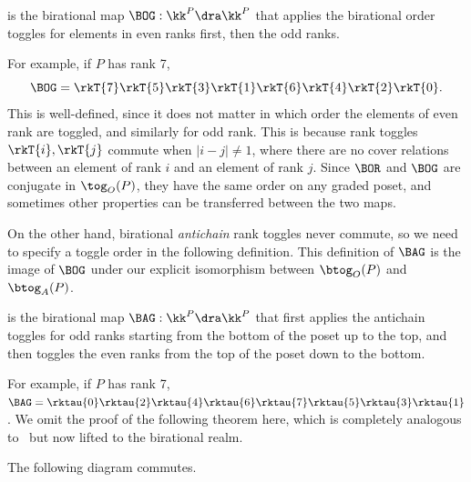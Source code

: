 \begin{defi}
 is the birational map
$\BOG: \kk^P \dra \kk^P$ that applies the birational order toggles for elements in even ranks first, then the odd ranks.
\end{defi}

For example, if $P$ has rank 7,
\[
\BOG=\rkT{7}\rkT{5}\rkT{3}\rkT{1}\rkT{6}\rkT{4}\rkT{2}\rkT{0}.
\]
This is well-defined, since it does not matter in which order the elements of even rank are toggled, and similarly for odd rank.
This is because rank toggles $\rkT{i}, \rkT{j}$ commute when $|i-j|\not= 1$, where there are
no cover relations between an element of rank $i$ and an element of rank $j$. 
Since $\BOR$ and $\BOG$ are conjugate in $\tog_O(P)$,
they have the same order on any graded poset, and sometimes other properties can be transferred between the two maps.

On the other hand, birational \emph{antichain}
rank toggles never commute, so we need to specify a toggle order in the following definition.
This definition of $\BAG$ is the image of $\BOG$
under our explicit isomorphism between $\btog_O(P)$ and $\btog_A(P)$.

\begin{defi}
 is the birational map
$\BAG:\kk^P \dra \kk^P$ that first applies the antichain toggles for odd ranks starting from the bottom of the poset
up to the top, and then toggles the even ranks from the top of the poset
down to the bottom.
\end{defi}

For example, if $P$ has rank 7,
$\BAG=\rktau{0}\rktau{2}\rktau{4}\rktau{6}\rktau{7}\rktau{5}\rktau{3}\rktau{1}$.
We omit the proof of the following theorem here, which is
completely analogous to~\cite[Theorem~2.34]{antichain-toggling} but now lifted to the birational realm.

\begin{theo}
The following diagram commutes.
\begin{center}
\end{center}
\end{theo}






